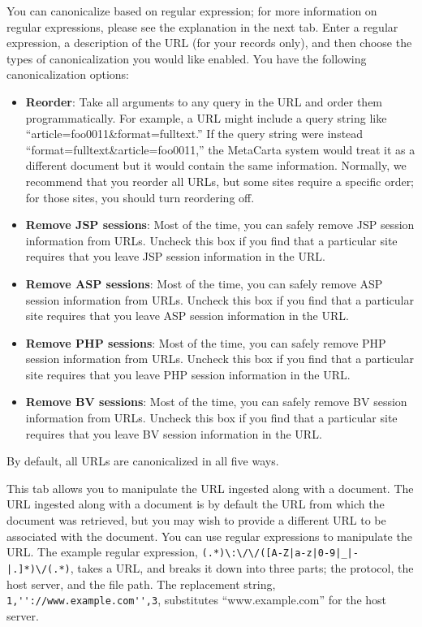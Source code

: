 You can canonicalize based on regular expression; for more information on
regular expressions, please see the explanation in the next tab. Enter
a regular expression, a description of the URL (for your records only),
and then choose the types of canonicalization you would like enabled. You
have the following canonicalization options:

\begin{itemize}

\item \textbf{Reorder}: Take all arguments to any query in the URL and
order them programmatically. For example, a URL might include a query
string like ``article=foo0011\&format=fulltext.'' If the query string
were instead ``format=fulltext\&article=foo0011,'' the MetaCarta system
would treat it as a different document but it would contain the same
information. Normally, we recommend that you reorder all URLs, but
some sites require a specific order; for those sites, you should turn
reordering off.

\item \textbf{Remove JSP sessions}: Most of the time, you can safely
remove JSP session information from URLs. Uncheck this box if you find
that a particular site requires that you leave JSP session information
in the URL.

\item \textbf{Remove ASP sessions}: Most of the time, you can safely
remove ASP session information from URLs. Uncheck this box if you find
that a particular site requires that you leave ASP session information
in the URL.

\item \textbf{Remove PHP sessions}: Most of the time, you can safely
remove PHP session information from URLs. Uncheck this box if you find
that a particular site requires that you leave PHP session information
in the URL.

\item \textbf{Remove BV sessions}: Most of the time, you can safely
remove BV session information from URLs. Uncheck this box if you find
that a particular site requires that you leave BV session information
in the URL.

\end{itemize}

By default, all URLs are canonicalized in all five ways. 


This tab allows you to manipulate the URL ingested along with a
document. The URL ingested along with a document is by default the URL
from which the document was retrieved, but you may wish to provide a
different URL to be associated with the document. You can use regular
expressions to manipulate the URL. The example regular expression,
\verb+(.*)\:\/\/([A-Z|a-z|0-9|_|-|.]*)\/(.*)+, takes a URL, and breaks
it down into three parts; the protocol, the host server, and the file
path. The replacement string, \verb+1,''://www.example.com'',3+,
substitutes ``www.example.com'' for the host server.

